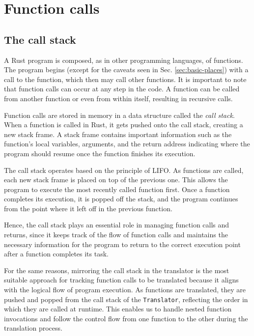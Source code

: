 \section{Function calls}

\subsection{The call stack}

A Rust program is composed, as in other programming languages, of functions.
The program begins (except for the caveats seen in Sec. \ref{sec:basic-places})
with a call to the  function, which then may call other functions.
It is important to note that function calls can occur at any step in the code.
A function can be called from another function or even from within itself, resulting in recursive calls.

Function calls are stored in memory in a data structure called the \emph{call stack}.
When a function is called in Rust, it gets pushed onto the call stack, creating a new stack frame.
A stack frame contains important information such as the function's local variables, arguments,
and the return address indicating where the program should resume once the function finishes its execution.

The call stack operates based on the principle of \acrfull{LIFO}.
As functions are called, each new stack frame is placed on top of the previous one.
This allows the program to execute the most recently called function first.
Once a function completes its execution, it is popped off the stack,
and the program continues from the point where it left off in the previous function.

Hence, the call stack plays an essential role in managing function calls and returns,
since it keeps track of the flow of function calls and maintains the necessary information
for the program to return to the correct execution point after a function completes its task.

For the same reasons, mirroring the call stack in the translator
is the most suitable approach for tracking function calls to be translated
because it aligns with the logical flow of program execution.
As functions are translated, they are pushed and popped
from the call stack of the \texttt{Translator},
reflecting the order in which they are called at runtime.
This enables us to handle nested function invocations and
follow the control flow from one function to the other during the translation process.

